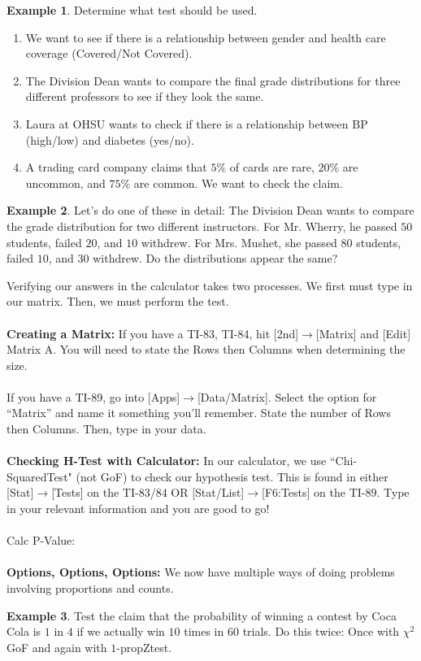 \documentclass[12pt]{amsart}
\theoremstyle{definition}
\newtheorem{ex}{Example}
\begin{document}
\begin{ex} Determine what test should be used.\end{ex}
\begin{enumerate}
 \item We want to see if there is a relationship between gender and health care coverage (Covered/Not Covered).
 \item The Division Dean wants to compare the final grade distributions for three different professors to see if they look the same.
 \item Laura at OHSU wants to check if there is a relationship between BP (high/low) and diabetes (yes/no).
 \item A trading card company claims that $5\%$ of cards are rare, $20\%$ are uncommon, and $75\%$ are common. We want to check the claim.
\end{enumerate}

\begin{ex}
Let's do one of these in detail: The Division Dean wants to compare the grade distribution for two different instructors. For Mr. Wherry, he passed $50$ students, failed $20$, and $10$ withdrew. For Mrs. Mushet, she passed $80$ students, failed $10$, and $30$ withdrew. Do the distributions appear the same?
\end{ex}

\vfill
\newpage
\noindent Verifying our answers in the calculator takes two processes. We first must type in our matrix. Then, we must perform the test.\\
~\\
\noindent \textbf{Creating a Matrix:} If you have a TI-83, TI-84, hit [2nd]$\rightarrow$[Matrix] and [Edit] Matrix A. You will need to state the Rows then Columns when determining the size.\\
~\\
If you have a TI-89, go into [Apps]$\rightarrow$[Data/Matrix]. Select the option for ``Matrix'' and name it something you'll remember. State the number of Rows then Columns. Then, type in your data.\\
~\\
\noindent \textbf{Checking H-Test with Calculator:} In our calculator, we use ``Chi-SquaredTest" (not GoF) to check our hypothesis test. This is found in either [Stat]$\rightarrow$[Tests] on the TI-83/84 OR [Stat/List]$\rightarrow$[F6:Tests] on the TI-89. Type in your relevant information and you are good to go!\\
~\\
Calc P-Value:\\
~\\
\newpage
\textbf{Options, Options, Options:} We now have multiple ways of doing problems involving proportions and counts.
\begin{ex}
 Test the claim that the probability of winning a contest by Coca Cola is $1$ in $4$ if we actually win $10$ times in $60$ trials. Do this twice: Once with $\chi^2$ GoF and again with $1$-propZtest.
\end{ex}
\vfill
\end{document}
